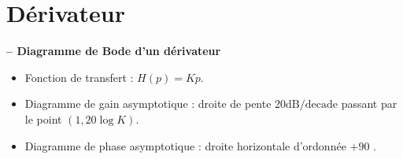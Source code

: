 \section{Dérivateur}
\begin{resultat}\textbf{\textsf{\small -- Diagramme de Bode d'un dérivateur}}~\\

\vspace{-.5cm}

\noindent\begin{minipage}[c]{.53\linewidth}
\begin{itemize}
\item Fonction de transfert : $H(p)={K}{p}$.
\item Diagramme de gain asymptotique : droite de pente ${20}\text{dB/decade}$ passant par le point $(1,20\log K)$.
\item Diagramme de phase asymptotique : droite horizontale d'ordonnée $+90$ \degre.
\end{itemize}
\end{minipage} \hfill
\begin{minipage}[c]{.45\linewidth}
\end{minipage}
\end{resultat}

\vspace{-.5cm}

